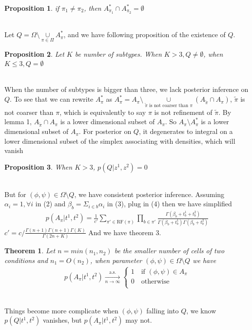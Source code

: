 \documentclass[11pt]{amsart}
\newtheorem{theorem}{Theorem}
\newtheorem{prop}{Proposition}
\begin{document}
\begin{prop}
if $\pi_1 \neq \pi_2$, then $A_{\pi_1}^*\cap A_{\pi_2}^* = \emptyset$
\end{prop}
\hfill\\
Let $Q = \Omega\setminus \underset{\pi\in \Pi}\cup A_\pi^*$, and we have following proposition of the existence of $Q$.
\begin{prop}
Let $K$ be number of subtypes. When $K >  3, Q \neq \emptyset$, when $K \leq 3, Q = \emptyset$
\end{prop}
\hfill\\
When the number of subtypes is bigger than three, we lack posterior inference on $Q$. To see that we can rewrite $A_\pi^*$ as $A_\pi^* = A_\pi\setminus \underset{\tilde{\pi} \text{ is not coarser than } \pi }\cup (A_{\tilde{\pi}}\cap A_\pi)$, $\tilde{\pi}$ is not coarser than $\pi$, which is equivalently to say $\pi$ is not refinement of $\tilde{\pi}$. By lemma 1, $A_{\tilde{\pi}}\cap A_\pi$ is a lower dimensional subset of $A_\pi$. So $A_\pi \setminus A_\pi^*$ is a lower dimensional subset of $A_\pi$. For posterior on $Q$, it degenerates to integral on a lower dimensional subset of the simplex associating with densities, which will vanish\\
\begin{prop}
When $K >  3$, $p(Q | z^1, z^2) = 0$
\end{prop}
\hfill\\
But for $(\phi, \psi)\in \Omega\setminus Q$, we have consistent posterior inference. Assuming $\alpha_i = 1, \forall i$ in (2) and $\beta_b = \Sigma_{i\in b} \alpha_i$ in (3), plug in (4) then we have simplified 
\begin{align}
p(A_\pi | t^1, t^2) = \frac{1}{c'}\sum_{\pi' \in \text{RF}(\pi)}\prod_{b\in \pi'}\frac{ \Gamma(\beta_b + t_b^1 + t_b^2)}{\Gamma(\beta_b + t_b^1)\Gamma(\beta_b + t_b^2)}
\end{align}
$c' = c/\frac{\Gamma(n + 1)\Gamma(n+1)\Gamma(K)}{\Gamma(2n + K)}$ And we have theorem 3.\\
\begin{theorem} Let $n = min(n_1, n_2)$ be the smaller number of cells of two conditions and $n_1 = O(n_2)$, when parameter $(\phi, \psi)\in \Omega\setminus Q $ we have 
\begin{eqnarray*}
    p(A_{\pi} | t^1, t^2) \xrightarrow[n\rightarrow\infty]{\text{a.s.}}\left\{
                \begin{array}{ll}
                 1 \quad \text{if }(\phi,\psi) \in A_\pi\\
                 0 \quad \text{otherwise}\\             
                \end{array}
              \right.
\end{eqnarray*}
\end{theorem}
\hfill\\
Things become more complicate when $(\phi, \psi)$ falling into $Q$, we know $p(Q | t^1, t^2)$ vanishes, but $p(A_\pi | t^1, t^2)$ may not. 
\end{document}
